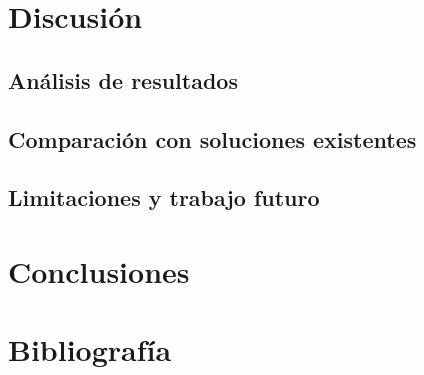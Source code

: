 \documentclass[12pt,a4paper,twoside]{report}
\begin{document}
\chapter{Discusión}
\label{chap:discusion}

\section{Análisis de resultados}
\label{sec:analisis_resultados}


\section{Comparación con soluciones existentes}
\label{sec:comparacion}


\section{Limitaciones y trabajo futuro}
\label{sec:futuro}


\chapter{Conclusiones}
\label{chap:conclusiones}


\chapter{Bibliografía}
\label{chap:bibliografia}



\end{document}
